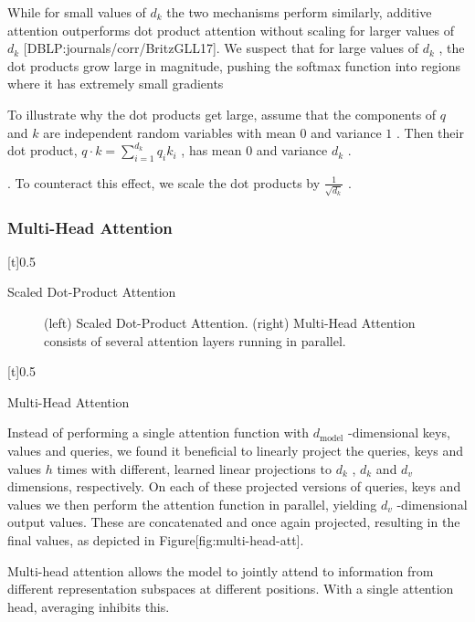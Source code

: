 \documentclass[11pt,a4paper]{article}
\begin{document}
While for small values of  $d_k$  the two mechanisms perform similarly, additive attention outperforms dot product attention without scaling for larger values of  $d_k$  [DBLP:journals/corr/BritzGLL17]. We suspect that for large values of  $d_k$ , the dot products grow large in magnitude, pushing the softmax function into regions where it has extremely small gradients

To illustrate why the dot products get large, assume that the components of  $q$  and  $k$  are independent random variables with mean  $0$  and variance  $1$ .  Then their dot product,  $q \cdot k = \sum_{i=1}^{d_k} q_ik_i$ , has mean  $0$  and variance  $d_k$ .

. To counteract this effect, we scale the dot products by  $\frac{1}{\sqrt{d_k}}$ .

\subsubsection{Multi-Head Attention}

[t]0.5

Scaled Dot-Product Attention

\begin{figure}[h]
\caption{(left) Scaled Dot-Product Attention. (right) Multi-Head Attention consists of several attention layers running in parallel.}
\end{figure}

[t]0.5

Multi-Head Attention

\begin{figure}[h]
\end{figure}

Instead of performing a single attention function with  $d_{\text{model}}$ -dimensional keys, values and queries, we found it beneficial to linearly project the queries, keys and values  $h$  times with different, learned linear projections to  $d_k$ ,  $d_k$  and  $d_v$  dimensions, respectively. On each of these projected versions of queries, keys and values we then perform the attention function in parallel, yielding  $d_v$ -dimensional output values. These are concatenated and once again projected, resulting in the final values, as depicted in Figure[fig:multi-head-att].

Multi-head attention allows the model to jointly attend to information from different representation subspaces at different positions. With a single attention head, averaging inhibits this.
\end{document}
